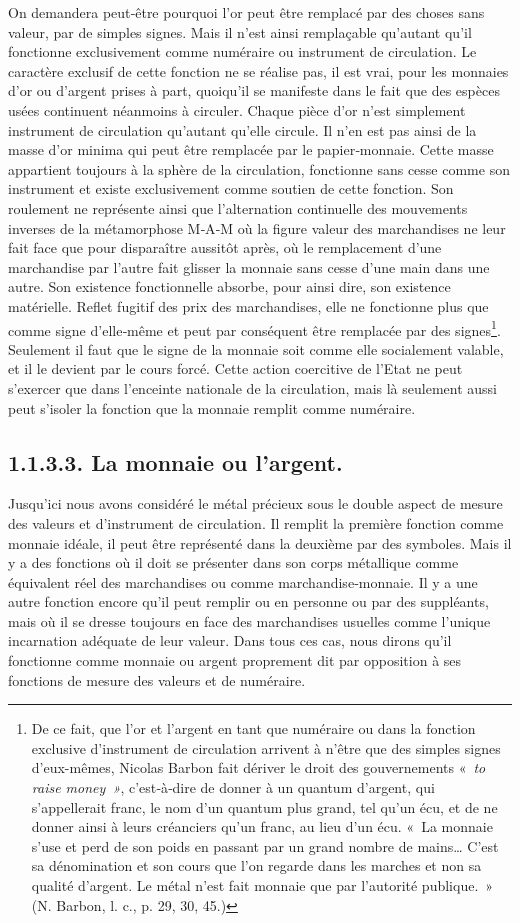 \documentclass[french,twoside]{book} %
\begin{document}
On demandera peut‑être pourquoi l’or peut être remplacé par des choses sans valeur, par de simples signes. Mais il n’est ainsi remplaçable qu’autant qu’il fonctionne exclusivement comme numéraire ou instrument de circulation. Le caractère exclusif de cette fonction ne se réalise pas, il est vrai, pour les monnaies d’or ou d’argent prises à part, quoiqu’il se manifeste dans le fait que des espèces usées continuent néanmoins à circuler. Chaque pièce d’or n’est simplement instrument de circulation qu’autant qu’elle circule. Il n’en est pas ainsi de la masse d’or minima qui peut être remplacée par le papier‑monnaie. Cette masse appartient toujours à la sphère de la circulation, fonctionne sans cesse comme son instrument et existe exclusivement comme soutien de cette fonction. Son roulement ne représente ainsi que l’alternation continuelle des mouvements inverses de la métamorphose M‑A‑M où la figure valeur des marchandises ne leur fait face que pour disparaître aussitôt après, où le remplacement d’une marchandise par l’autre fait glisser la monnaie sans cesse d’une main dans une autre. Son existence fonctionnelle absorbe, pour ainsi dire, son existence matérielle. Reflet fugitif des prix des marchandises, elle ne fonctionne plus que comme signe d’elle‑même et peut par conséquent être remplacée par des signes\footnote{De ce fait, que l’or et l’argent en tant que numéraire ou dans la fonction exclusive d’instrument de circulation arrivent à n’être que des simples signes d’eux-mêmes, Nicolas Barbon fait dériver le droit des gouvernements « \emph{to raise money »}, c’est‑à‑dire de donner à un quantum d’argent, qui s’appellerait franc, le nom d’un quantum plus grand, tel qu’un écu, et de ne donner ainsi à leurs créanciers qu’un franc, au lieu d’un écu. « La monnaie s’use et perd de son poids en passant par un grand nombre de mains… C’est sa dénomination et son cours que l’on regarde dans les marches et non sa qualité d’argent. Le métal n’est fait monnaie que par l’autorité publique. » (N. Barbon, l. c., p. 29, 30, 45.)}. Seulement il faut que le signe de la monnaie soit comme elle socialement valable, et il le devient par le cours forcé. Cette action coercitive de l’Etat ne peut s’exercer que dans l’enceinte nationale de la circulation, mais là seulement aussi peut s’isoler la fonction que la monnaie remplit comme numéraire.
\subsection[{1.1.3.3. La monnaie ou l’argent.}]{1.1.3.3. La monnaie ou l’argent.}
\noindent Jusqu’ici nous avons considéré le métal précieux sous le double aspect de mesure des valeurs et d’instrument de circulation. Il remplit la première fonction comme monnaie idéale, il peut être représenté dans la deuxième par des symboles. Mais il y a des fonctions où il doit se présenter dans son corps métallique comme équivalent réel des marchandises ou comme marchandise‑monnaie. Il y a une autre fonction encore qu’il peut remplir ou en personne ou par des suppléants, mais où il se dresse toujours en face des marchandises usuelles comme l’unique incarnation adéquate de leur valeur. Dans tous ces cas, nous dirons qu’il fonctionne comme monnaie ou argent proprement dit par opposition à ses fonctions de mesure des valeurs et de numéraire.\par
\end{document}
